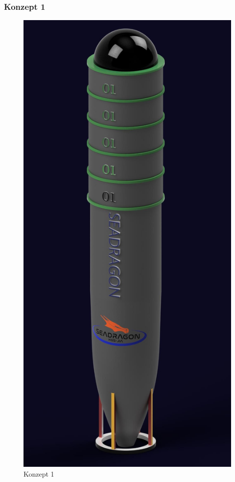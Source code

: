 \documentclass[11pt]{article}
\begin{document}
\subsubsection{Konzept 1}
\begingroup
\begin{figure}
\centering
  {\setlength{\belowcaptionskip}{-20pt}
    \includegraphics[width=\linewidth]{Konzept-1.jpg}
    \caption{Konzept 1}
  }
\end{figure}
\KonteptEins
\end{document}
